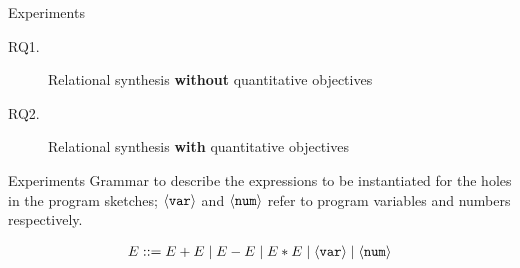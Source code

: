 \begin{frame}{Experiments}
    \begin{description}
        \item[RQ1.] Relational synthesis \textbf{without} quantitative objectives
        \item[RQ2.] Relational synthesis \textbf{with} quantitative objectives
    \end{description}
\end{frame}

\begin{frame}{Experiments}
    Grammar to describe the expressions to be instantiated for the holes in the program sketches; $\langle \texttt{var} \rangle$ and $\langle \texttt{num} \rangle$ refer to program variables and numbers respectively.
    \pause
    \vspace{20pt}
        \begin{tcolorbox}[
        colback=white,
        colframe=green,
        colbacktitle=white!70!green,
        coltitle=black,
        title=\textbf{Domain Specific Language},
        enhanced,
        attach boxed title to top left={yshift=-2mm, xshift=0.2cm},%
        ]
        \begin{align*}
            E ::= E + E \mid E - E \mid E * E \mid \langle \texttt{var} \rangle \mid \langle \texttt{num} \rangle \label{eq:dsl}
        \end{align*}
    \end{tcolorbox}
\end{frame}

